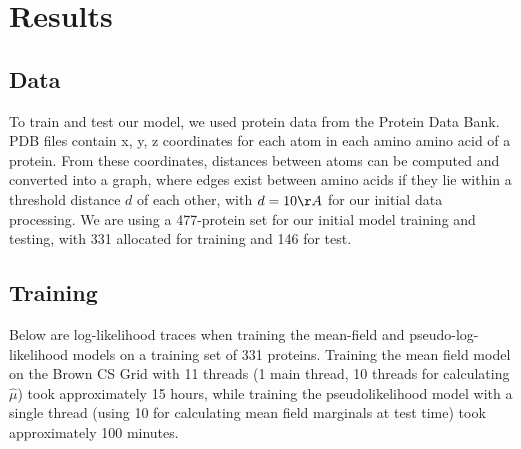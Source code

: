 \documentclass{article}
\begin{document}

\section{Results}

\subsection{Data}


To train and test our model, we used protein data from the Protein Data Bank. PDB files contain x, y, z coordinates for each atom in each amino amino acid of a protein. From these coordinates, distances between atoms can be computed and converted into a graph, where edges exist between amino acids if they lie within a threshold distance $d$ of each other, with $d = 10 {\AA}$ for our initial data processing. We are using a 477-protein set for our initial model training and testing, with 331 allocated for training and 146 for test. 

\subsection{Training}

Below are log-likelihood traces when training the mean-field and pseudo-log-likelihood models on a training set of 331 proteins. Training the mean field model on the Brown CS Grid with 11 threads (1 main thread, 10 threads for calculating $\hat{\mu}$) took approximately 15 hours, while training the pseudolikelihood model with a single thread (using 10 for calculating mean field marginals at test time) took approximately 100 minutes. 
\end{document}
